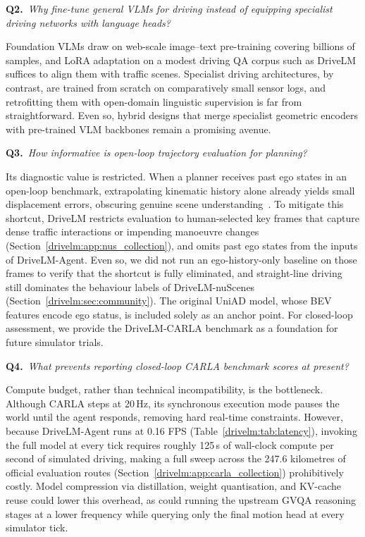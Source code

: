 \medskip\noindent\textbf{Q2.}~\emph{Why fine-tune general VLMs for driving instead of equipping specialist driving networks with language heads?}

\noindent Foundation VLMs draw on web-scale image--text pre-training covering billions of samples, and LoRA adaptation on a modest driving QA corpus such as DriveLM suffices to align them with traffic scenes. Specialist driving architectures, by contrast, are trained from scratch on comparatively small sensor logs, and retrofitting them with open-domain linguistic supervision is far from straightforward. Even so, hybrid designs that merge specialist geometric encoders with pre-trained VLM backbones remain a promising avenue.

\medskip\noindent\textbf{Q3.}~\emph{How informative is open-loop trajectory evaluation for planning?}

\noindent Its diagnostic value is restricted. When a planner receives past ego states in an open-loop benchmark, extrapolating kinematic history alone already yields small displacement errors, obscuring genuine scene understanding~\cite{li2024ego}. To mitigate this shortcut, DriveLM restricts evaluation to human-selected key frames that capture dense traffic interactions or impending manoeuvre changes (Section~\ref{drivelm:app:nus_collection}), and omits past ego states from the inputs of DriveLM-Agent. Even so, we did not run an ego-history-only baseline on those frames to verify that the shortcut is fully eliminated, and straight-line driving still dominates the behaviour labels of DriveLM-nuScenes (Section~\ref{drivelm:sec:community}). The original UniAD model, whose BEV features encode ego status, is included solely as an anchor point. For closed-loop assessment, we provide the DriveLM-CARLA benchmark as a foundation for future simulator trials.

\medskip\noindent\textbf{Q4.}~\emph{What prevents reporting closed-loop CARLA benchmark scores at present?}

\noindent Compute budget, rather than technical incompatibility, is the bottleneck. Although CARLA steps at 20\,Hz, its synchronous execution mode pauses the world until the agent responds, removing hard real-time constraints. However, because DriveLM-Agent runs at 0.16 FPS (Table~\ref{drivelm:tab:latency}), invoking the full model at every tick requires roughly 125\,s of wall-clock compute per second of simulated driving, making a full sweep across the 247.6 kilometres of official evaluation routes (Section~\ref{drivelm:app:carla_collection}) prohibitively costly. Model compression via distillation, weight quantisation, and KV-cache reuse could lower this overhead, as could running the upstream GVQA reasoning stages at a lower frequency while querying only the final motion head at every simulator tick.

